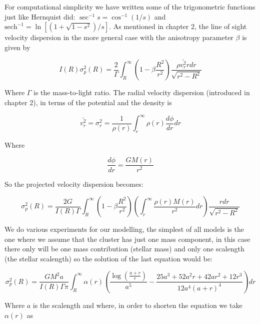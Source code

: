 For computational simplicity we have written some of the trigonometric functions just like Hernquist did: $\sec^{-1}s = \cos^{-1}(1/s)$ and $\text{sech}^{-1} = \ln[(1+\sqrt{1-s^{2}})/s]$. As mentioned in chapter 2, the line of sight velocity dispersion in the more general case with the anisotropy parameter $\beta$ is given by

\begin{equation}
I(R)\sigma_{p}^{2}(R)=\frac{2}{\Gamma}\int_{R}^{\infty}\left(1-\beta\frac{R^{2}}{r^{2}}\right)\frac{\rho\bar{v_{r}^{2}}rdr}{\sqrt{r^{2}-R^{2}}}
\end{equation}

Where $\Gamma$ is the mass-to-light ratio. The radial velocity dispersion (introduced in chapter 2), in terms of the potential and the density is

\begin{equation}
\bar{v_{r}^{2}}=\sigma_{r}^{2}=\frac{1}{\rho(r)}\int_{r}^{\infty}\rho(r)\frac{d\phi}{dr}dr
\end{equation}

Where 

\begin{equation}
\frac{d\phi}{dr}=\frac{GM(r)}{r^{2}}
\end{equation}

So the projected velocity dispersion becomes:

\begin{equation}
\sigma_{p}^{2}(R)=\frac{2G}{I(R)\Gamma}\int_{R}^{\infty}\left(1-\beta\frac{R^{2}}{r^{2}}\right)\left(\int_{r}^{\infty}\frac{\rho(r)M(r)}{r^{2}}dr\right)\frac{rdr}{\sqrt{r^{2}-R^{2}}}
\end{equation}

We do various experiments for our modelling, the simplest of all models is the one where we assume that the cluster has just one mass component, in this case there only will be one mass contribution (stellar mass) and only one scalength (the stellar scalength) so the solution of the last equation would be:

\begin{equation}
\sigma_{p}^{2}(R)=\frac{GM^{2}a}{I(R)\Gamma\pi}\int_{R}^{\infty}\alpha(r)\left(\frac{\log{\left(\frac{a+r}{r}\right)}}{a^{5}}-\frac{25a^{3}+52a^{2}r+42ar^{2}+12r^{3}}{12a^{4}\left(a+r\right)^{4}}\right)dr
\end{equation}

Where $a$ is the scalength and where, in order to shorten the equation we take $\alpha(r)$ as 

